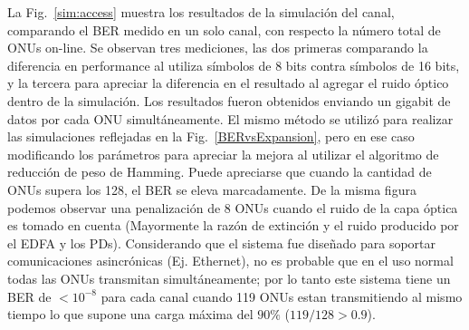 La Fig.~\ref{sim:access} muestra los resultados de la simulación del canal, comparando el BER medido en un solo canal, con respecto la número total de ONUs on-line. Se observan tres mediciones, las dos primeras comparando la diferencia en performance al utiliza símbolos de 8 bits contra símbolos de 16 bits, y la tercera para apreciar la diferencia en el resultado al agregar el ruido óptico dentro de la simulación.
Los resultados fueron obtenidos enviando un gigabit de datos por cada ONU simultáneamente. El mismo método se utilizó para realizar las simulaciones reflejadas en la Fig.~\ref{BERvsExpansion}, pero en ese caso modificando los parámetros para apreciar la mejora al utilizar el algoritmo de reducción de peso de Hamming.
Puede apreciarse que cuando la cantidad de ONUs supera los 128, el BER se eleva marcadamente.
De la misma figura podemos observar una penalización de $8$ ONUs cuando el ruido de la capa óptica es tomado en cuenta (Mayormente la razón de extinción y el ruido producido por el EDFA y los PDs).
Considerando que el sistema fue diseñado para soportar comunicaciones asincrónicas (Ej. Ethernet), no es probable que en el uso normal todas las ONUs transmitan simultáneamente; por lo tanto este sistema tiene un BER de $<10^{-8}$ para cada canal cuando 119 ONUs estan transmitiendo al mismo tiempo lo que supone una carga máxima del $90\%$ ($119/128>0.9$). 



